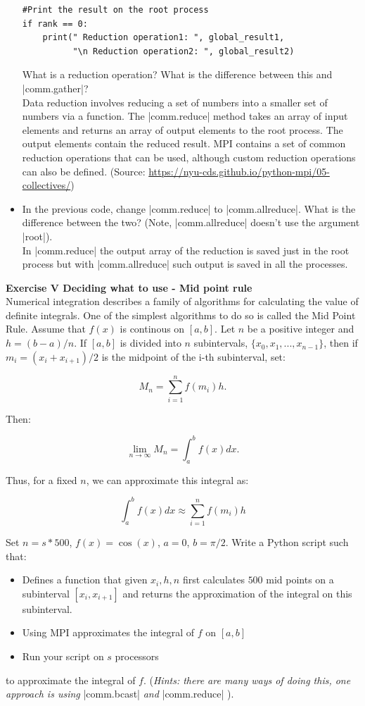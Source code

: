 \documentclass[11pt]{article}
\begin{document}
\begin{itemize}
\begin{verbatim}
#Print the result on the root process
if rank == 0:
    print(" Reduction operation1: ", global_result1,
          "\n Reduction operation2: ", global_result2)
   \end{verbatim}
   What is a reduction operation? What is the difference between this and |comm.gather|? \\
   Data reduction involves reducing a set of numbers into a smaller set of numbers via a function. The |comm.reduce| method takes an array of input elements and returns an array of output elements to the root process. The output elements contain the reduced result. MPI contains a set of common reduction operations that can be used, although custom reduction operations can also be defined. 
   (Source: \url{https://nyu-cds.github.io/python-mpi/05-collectives/})
   \item In the previous code, change |comm.reduce| to |comm.allreduce|. What is the difference between the two? (Note, |comm.allreduce| doesn't use the argument |root|). \\
   In |comm.reduce| the output array of the reduction is saved just in the root process but with |comm.allreduce| such output is saved in all the processes. 
   
\end{itemize}


{\bf{Exercise V Deciding what to use - Mid point rule }}\\

Numerical integration describes a family of algorithms for calculating the value of definite integrals. One of the simplest algorithms to do so is called the Mid Point Rule. Assume that $f(x)$ is continous on $[a,b]$. Let $n$ be a positive integer and $h = (b-a)/n$. If $[a,b]$ is divided into $n$ subintervals, $\{ x_0, x_1, ..., x_{n-1} \}$, then if $m_i = (x_{i} + x_{i+1} )/2$ is the midpoint of the i-th subinterval, set:

\[ M_n = \sum_{i=1}^{n} f(m_i)h. \]

Then:

\[ \underset{n \to \infty}{\lim}M_n = \int_a^b f(x) dx. \]

Thus, for a fixed $n$, we can approximate this integral as:

\[ \int_a^b f(x) dx \approx \sum_{i=1}^{n} f(m_i)h  \]

Set $n = s*500$, $f(x) = \cos(x)$, $a = 0$, $b = \pi /2$. Write a Python script such that:
\begin{itemize}
    \item Defines a function that given $x_i, h, n$ first calculates $500$ mid points on a subinterval $[x_{i}, x_{i+1}]$ and returns the approximation of the integral on this subinterval.
    \item Using MPI approximates the integral of $f$ on $[a,b]$
    \item Run your script on $s$ processors
\end{itemize}


to approximate the integral of $f$. (\textit{Hints: there are many ways of doing this, one approach is using } |comm.bcast| \textit{ and } |comm.reduce| ). \\


\end{document}
